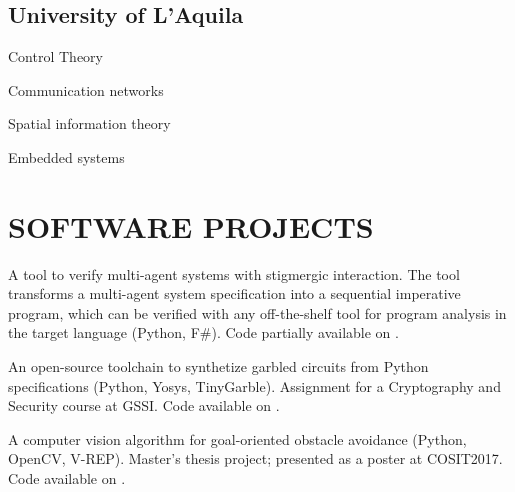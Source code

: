 \documentclass[a4paper]{deedy-resume-openfont}
\begin{document}
\begin{minipage}[t]{0.67\textwidth}
\subsection{University of L'Aquila}
\begin{tightemize}
\item Control Theory
\item Communication networks
\item Spatial information theory
\item Embedded systems
\end{tightemize}
\sectionsep%

\section{SOFTWARE PROJECTS}
\location{\hspace{1em}}

\begin{tightemize}
\item
A tool to verify multi-agent systems with stigmergic interaction.
The tool transforms a multi-agent system specification into a sequential
imperative program, which can be verified with any off-the-shelf tool for
program analysis in the target language (Python, F\#).
Code partially available on \href{https://github.com/labs-lang/sliver}{}.

\item 
An open-source toolchain to synthetize garbled circuits from Python specifications (Python, Yosys, TinyGarble).
Assignment for a Cryptography and Security course at GSSI.
Code available on \href{https://github.com/lou1306/gssi/blob/master/2pc/}{}.
\item
A computer vision algorithm
for goal-oriented obstacle avoidance (Python, OpenCV, V-REP).
Master's thesis project; presented as a poster at COSIT2017. 
Code available on \href{https://github.com/lou1306/localpathplanner}{}.
\end{tightemize}

\end{minipage} 
\end{document}
